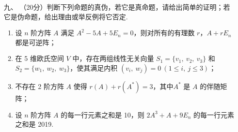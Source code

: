 \begin{enumerate}
    \item[九、]（20分）判断下列命题的真伪，若它是真命题，请给出简单的证明；若它是伪命题，给出理由或举反例将它否定.
    \begin{enumerate}[label=(\arabic*)]
        \item 设 $n$ 阶方阵 $A$ 满足 $A^2-5A+5E_n=0$，则对所有的有理数 $r$，$A+rE_n$ 都是可逆阵；

        \item 在 5 维欧氏空间 $V$ 中，存在两组线性无关向量 $S_1=\{v_1,\ v_2,\ v_3\}$ 和 $S_2=\{w_1,\ w_2,\ w_3\}$，使其满足内积 $(v_i,\ w_j)=0\ (1 \leqslant i,\ j \leqslant 3)$；

        \item 不存在 2 阶方阵 $A$ 使得 $r(A)+r(A^*)=3$，其中$A^*$ 是 $A$ 的伴随矩阵；

        \item 设 $n$ 阶方阵 $A$ 的每一行元素之和是 10，则 $2A^3+A+9E_n$ 的每一行元素之和是 2019.
    \end{enumerate}
\end{enumerate}

\clearpage
